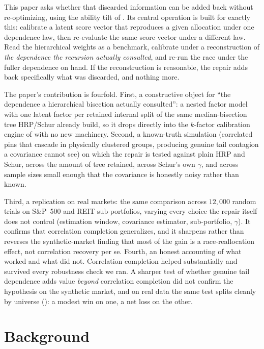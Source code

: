 \documentclass[11pt]{article}
\begin{document}
This paper asks whether that discarded information can be added back without
re-optimizing, using the ability tilt of \textcite{cotton2026polish}. Its
central operation is built for exactly this: calibrate a latent score vector
that reproduces a given allocation under one dependence law, then
re-evaluate the same score vector under a different law. Read the
hierarchical weights as a benchmark, calibrate under a reconstruction of
\emph{the dependence the recursion actually consulted}, and re-run the race
under the fuller dependence on hand. If the reconstruction is reasonable, the
repair adds back specifically what was discarded, and nothing more.

The paper's contribution is fourfold. First, a constructive object for ``the
dependence a hierarchical bisection actually consulted'': a nested factor
model with one latent factor per retained internal split of the same
median-bisection tree HRP/Schur already build, so it drops directly into the
$k$-factor calibration engine of \textcite{cotton2026factorprobit} with no new
machinery. Second, a known-truth simulation (correlated pins that cascade in
physically clustered groups, producing genuine tail contagion a covariance
cannot see) on which the repair is tested against plain HRP and Schur, across
the amount of tree retained, across Schur's own $\gamma$, and across sample
sizes small enough that the covariance is honestly noisy rather than known.

Third, a replication on real markets: the same comparison across $12{,}000$
random trials on S\&P~500 and REIT sub-portfolios, varying every choice the
repair itself does not control (estimation window, covariance estimator,
sub-portfolio, $\gamma$). It confirms that correlation completion
generalizes, and it sharpens rather than reverses the synthetic-market
finding that most of the gain is a race-reallocation effect, not correlation
recovery per se. Fourth, an honest accounting of what worked and what did
not. Correlation completion helped substantially and survived every
robustness check we ran. A sharper test of whether genuine tail dependence
adds value \emph{beyond} correlation completion did not confirm the
hypothesis on the synthetic market, and on real data the same test splits
cleanly by universe (): a modest win on one, a net
loss on the other.

\section{Background}
\end{document}
